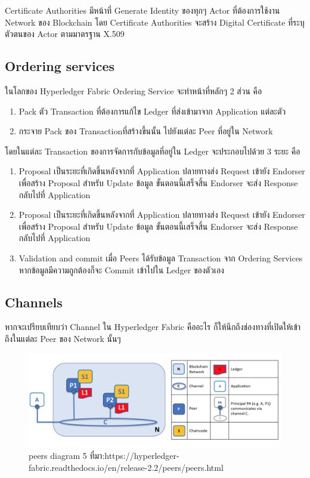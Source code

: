 Certificate Authorities มีหน้าที่ Generate Identity ของทุกๆ Actor ที่ต้องการใช้งาน Network ของ Blockchain โดย Certificate Authorities จะสร้าง Digital Certificate ที่ระบุตัวตนของ Actor ตามมาตรฐาน X.509

\subsection{Ordering services}
ในโลกของ Hyperledger Fabric Ordering Service จะทำหน้าที่หลักๆ 2 ส่วน คือ
\begin{enumerate}
  \item Pack ตัว Transaction ที่ต้องการแก้ไข Ledger ที่ส่งเข้ามาจาก Application แต่ละตัว 
  \item กระจาย Pack ของ Transactionที่สร้างขึ้นนั้น ไปยังแต่ละ Peer ที่อยู่ใน Network
\end{enumerate}

โดยในแต่ละ Transaction ของการจัดการกับข้อมูลที่อยู่ใน Ledger จะประกอบไปด้วย 3 ระยะ คือ

\begin{enumerate}
  \item Proposal
  เป็นระยะที่เกิดขึ้นหลังจากที่ Application ปลายทางส่ง Request เข้ายัง Endorser เพื่อสร้าง Proposal สำหรับ Update ข้อมูล ขั้นตอนนี้เสร็จสิ้น Endorser จะส่ง Response กลับไปที่ Application
  \item Proposal
  เป็นระยะที่เกิดขึ้นหลังจากที่ Application ปลายทางส่ง Request เข้ายัง Endorser เพื่อสร้าง Proposal สำหรับ Update ข้อมูล ขั้นตอนนี้เสร็จสิ้น Endorser จะส่ง Response กลับไปที่ Application
  \item Validation and commit
  เมื่อ Peers ได้รับข้อมูล Transaction จาก Ordering Services หากข้อมูลมีความถูกต้องก็จะ Commit เข้าไปใน Ledger ของตัวเอง
\end{enumerate}

\subsection{Channels}
หากจะเปรียบเทียบว่า Channel ใน Hyperledger Fabric คืออะไร ก็ให้นึกถึงช่องทางที่เปิดให้เข้าถึงในแต่ละ Peer ของ Network นั้นๆ

\begin{figure}[htbp]
  \centering 
  \includegraphics[scale=0.3]{peers diagram 5.png}
  \caption[peers diagram 5]{peers diagram 5
  ที่มา:https://hyperledger-fabric.readthedocs.io/en/release-2.2/peers/peers.html}
  \label{fig:peers diagram 5}
\end{figure}

